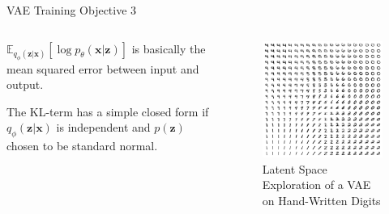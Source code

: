 \documentclass{beamer}
\begin{document}
    \begin{frame}{VAE Training Objective 3}
        \begin{columns}
            \begin{column}{0.48\textwidth}
                $\mathbb{E}_{q_\phi(\bm{z}|\bm{x})}\left[ \log p_\theta(\bm{x}|\bm{z}) \right]$ is basically the mean squared error between input and output.

                The KL-term has a simple closed form if $q_\phi(\bm{z}|\bm{x})$ is independent and $p(\bm{z})$ chosen to be standard normal.
            \end{column}
            \begin{column}{0.48\textwidth}
                \begin{figure}
                    \centering
                    \includegraphics[width=\textwidth]{images/latent_space_traversals/vae_mnist.png}
                    \caption{Latent Space Exploration of a VAE on Hand-Written Digits}
                    \label{fig:vae_mnist}
                \end{figure}
            \end{column}
        \end{columns}
    \end{frame}
\end{document}
